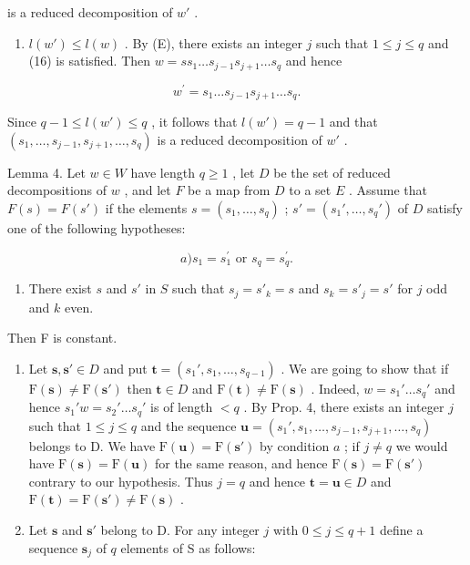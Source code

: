 is a reduced decomposition of \(w'\) .

\begin{enumerate}
\def\labelenumi{\alph{enumi})}
\setcounter{enumi}{1}
\tightlist
\item
  \(l(w') \leqslant l(w)\) . By (E), there exists an integer \(j\) such that \(1 \leqslant j \leqslant q\) and (16) is satisfied. Then \(w = ss_1 \ldots s_{j-1}s_{j+1} \ldots s_q\) and hence
\end{enumerate}

\[
w ^ {\prime} = s _ {1} \dots s _ {j - 1} s _ {j + 1} \dots s _ {q}.
\]

Since \(q - 1 \leqslant l(w') \leqslant q\) , it follows that \(l(w') = q - 1\) and that \((s_1, \ldots, s_{j-1}, s_{j+1}, \ldots, s_q)\) is a reduced decomposition of \(w'\) .

Lemma 4. Let \(w \in W\) have length \(q \geqslant 1\) , let \(D\) be the set of reduced decompositions of \(w\) , and let \(F\) be a map from \(D\) to a set \(E\) . Assume that \(F(s) = F(s')\) if the elements \(s = (s_1, \ldots, s_q)\) ; \(s' = (s_1', \ldots, s_q')\) of \(D\) satisfy one of the following hypotheses:

\[
a) s _ {1} = s _ {1} ^ {\prime} \text {   or   } s _ {q} = s _ {q} ^ {\prime}.
\]

\begin{enumerate}
\def\labelenumi{\alph{enumi})}
\setcounter{enumi}{1}
\tightlist
\item
  There exist \(s\) and \(s'\) in \(S\) such that \(s_j = s'_k = s\) and \(s_k = s'_j = s'\) for \(j\) odd and \(k\) even.
\end{enumerate}

Then F is constant.

\begin{enumerate}
\def\labelenumi{\Alph{enumi})}
\item
  Let \(\mathbf{s}, \mathbf{s}' \in D\) and put \(\mathbf{t} = (s_1', s_1, \ldots, s_{q-1})\) . We are going to show that if \(\mathrm{F}(\mathbf{s}) \neq \mathrm{F}(\mathbf{s}')\) then \(\mathbf{t} \in D\) and \(\mathrm{F}(\mathbf{t}) \neq \mathrm{F}(\mathbf{s})\) . Indeed, \(w = s_1' \ldots s_q'\) and hence \(s_1' w = s_2' \ldots s_q'\) is of length \(< q\) . By Prop. 4, there exists an integer \(j\) such that \(1 \leqslant j \leqslant q\) and the sequence \(\mathbf{u} = (s_1', s_1, \ldots, s_{j-1}, s_{j+1}, \ldots, s_q)\) belongs to D. We have \(\mathrm{F}(\mathbf{u}) = \mathrm{F}(\mathbf{s}')\) by condition \(a\) ; if \(j \neq q\) we would have \(\mathrm{F}(\mathbf{s}) = \mathrm{F}(\mathbf{u})\) for the same reason, and hence \(\mathrm{F}(\mathbf{s}) = \mathrm{F}(\mathbf{s}')\) contrary to our hypothesis. Thus \(j = q\) and hence \(\mathbf{t} = \mathbf{u} \in D\) and \(\mathrm{F}(\mathbf{t}) = \mathrm{F}(\mathbf{s}') \neq \mathrm{F}(\mathbf{s})\) .
\item
  Let \(\mathbf{s}\) and \(\mathbf{s}'\) belong to D. For any integer \(j\) with \(0 \leqslant j \leqslant q + 1\) define a sequence \(\mathbf{s}_j\) of \(q\) elements of S as follows:
\end{enumerate}

